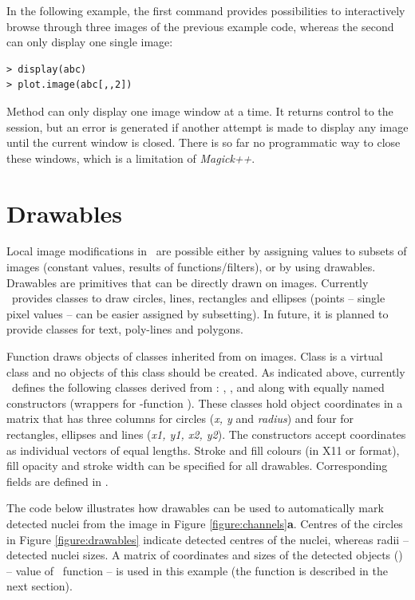 In the following example, the first command provides possibilities to interactively browse through three images of the previous example code, whereas the second can only display one single image:

\begin{verbatim}
> display(abc)
> plot.image(abc[,,2])
\end{verbatim}

Method  can only display one image window at a time. It returns control to the \R{} session, but an error is generated if another attempt is made to display any image until the current window is closed. There is so far no programmatic way to close these windows, which is a limitation of {\em Magick++}.

\section*{Drawables}

Local image modifications in \EBImage\ are possible either by assigning values to subsets of images (constant values, results of functions/filters), or by using drawables. Drawables are primitives that can be directly drawn on images. Currently \EBImage\ provides classes to draw circles, lines, rectangles and ellipses (points -- single pixel values -- can be easier assigned by subsetting). In future, it is planned to provide classes for text, poly-lines and polygons.

Function  draws objects of classes inherited from  on images. Class  is a virtual class and no objects of this class should be created. As indicated above, currently \EBImage\ defines the following classes derived from : , ,  and  along with equally named constructors (wrappers for \R{}-function ). These classes hold object coordinates in a matrix that has three columns for circles ({\em x, y} and {\em radius}) and four for rectangles, ellipses and lines ({\em x1, y1, x2, y2}). The constructors accept coordinates as individual vectors of equal lengths. Stroke and fill colours (in X11 or \R{} format), fill opacity and stroke width can be specified for all drawables. Corresponding fields are defined in .

The code below illustrates how drawables can be used to automatically mark detected nuclei from the image in Figure \ref{figure:channels}{\bf a}. Centres of the circles in Figure \ref{figure:drawables} indicate detected centres of the nuclei, whereas radii -- detected nuclei sizes. A matrix of coordinates and sizes of the detected objects () -- value of \EBImage\ function  -- is used in this example (the function is described in the next section).

